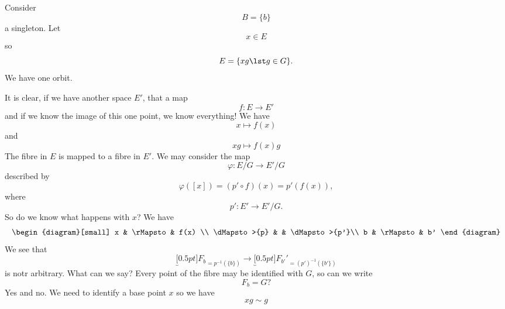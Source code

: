 \begin{ex}
Consider
\begin{equation}
B=\{b\}
\end{equation}
a singleton. Let 
\begin{equation}
x\in E
\end{equation}
so
\begin{equation}
E=\{xg\lst g\in G\}.
\end{equation}
We have one orbit.

It is clear, if we have another space $E'$, that a map
\begin{equation}
f\colon E\to E'
\end{equation}
and if we know the image of this one point, we know everything!
We have
\begin{equation}
x\mapsto f(x)
\end{equation}
and
\begin{equation}
xg\mapsto f(x)g
\end{equation}
The fibre in $E$ is mapped to a fibre in $E'$. We may consider
the map
\begin{equation}
\varphi\colon E/G\to E'/G
\end{equation}
described by
\begin{equation}
\varphi([x])=(p'\circ f)(x)=p'\left(f(x)\right),
\end{equation}
where
\begin{equation}
p'\colon E'\to E'/G.
\end{equation}
So do we know what happens with $x$? We have
\begin{equation}
\begin{diagram}[small]
  x          & \rMapsto & f(x) \\
\dMapsto>{p} &          & \dMapsto>{p'}\\
 b           & \rMapsto & b'
\end{diagram}
\end{equation}
We see that 
\begin{equation}
\underbracket[0.5pt]{F_{b}}_{=p^{-1}(\{b\})}\to \underbracket[0.5pt]{F_{b'}'}_{=(p')^{-1}(\{b'\})}
\end{equation}
is notr arbitrary. What can we say? Every point of the fibre may
be identified with $G$, so can we write
\begin{equation}
F_{b}=G?
\end{equation}
Yes and no. We need to identify a base point $x$ so we have 
\begin{equation}
xg\sim g
\end{equation}

\end{ex}
